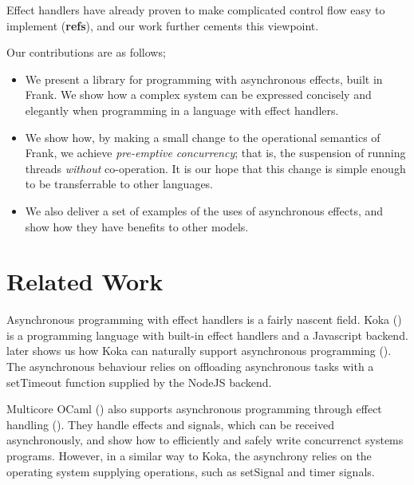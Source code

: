 \documentclass[msc,deptreport,cs]{infthesis} %
\newcommand{\todo}[1]
           {{\par\noindent\small\color{RoyalPurple}
  \framebox{\parbox{\dimexpr\linewidth-2\fboxsep-2\fboxrule}
    {\textbf{TODO:} #1}}}}
\begin{document}
Effect handlers have
already proven to make complicated control flow easy to implement
(\textbf{refs}), and our work further cements this viewpoint.

Our contributions are as follows;

\begin{itemize}
\item We present a library for programming with asynchronous effects, built in
  Frank. We show how a complex system can be expressed concisely and elegantly
  when programming in a language with effect handlers.

\item We show how, by making a small change to the operational semantics of
  Frank, we achieve \emph{pre-emptive concurrency}; that is, the suspension of
  running threads \emph{without} co-operation. It is our hope that this change
  is simple enough to be transferrable to other languages.

\item We also deliver a set of examples of the uses of asynchronous effects, and
  show how they have benefits to other models.
\end{itemize}

\section{Related Work}

Asynchronous programming with effect handlers is a fairly nascent field.
%
Koka (\cite{leijen2014koka}) is a programming language with built-in effect
handlers and a Javascript backend. \citeauthor{leijen2017structured} later shows
us how Koka can naturally support asynchronous programming
(\cite{leijen2017structured}). The asynchronous behaviour relies on offloading
asynchronous tasks with a \textsf{setTimeout} function supplied by the NodeJS
backend.

Multicore OCaml (\cite{dolan2014multicore}) also supports asynchronous
programming through effect handling (\cite{dolan2017concurrent}). They handle
effects and signals, which can be received asynchronously, and show how to
efficiently and safely write concurrenct systems programs. However, in a similar
way to Koka, the asynchrony relies on the operating system supplying operations,
such as \textsf{setSignal} and \textsf{timer} signals.
\end{document}
